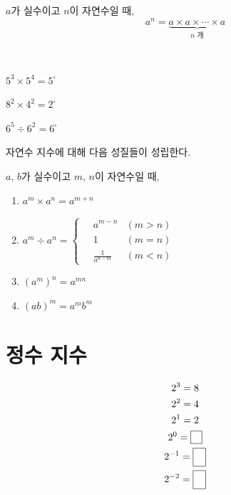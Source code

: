 \documentclass{oblivoir}
\begin{document}
\begin{mdframed}
%
\label{natural2}
\(a\)가 실수이고 \(n\)이 자연수일 때,
\[a^n=\underbrace{a\times a\times\cdots\times a}_\text{$n$ 개}\]
\end{mdframed}

%
\label{natural3}
\\[-10pt]
\begin{enumerate*}[itemjoin=\hspace{0.15\textwidth}]
\item
\(5^3\times5^4=5^\square\)
\item
\(8^2\times4^2=2^\square\)
\item
\(6^5\div6^2=6^\square\)
\end{enumerate*}

\bigskip\noindent
자연수 지수에 대해 다음 성질들이 성립한다.
%
\begin{mdframed}
\label{natural4}
\(a\), \(b\)가 실수이고 \(m\), \(n\)이 자연수일 때,
\begin{enumerate}
\item
\(a^m\times a^n=a^{m+n}\)
\item
\(\displaystyle a^m\div a^n=
\begin{cases}
\quad	a^{m-n}		&(m>n)\\
\quad	1			&(m=n)\\
\quad	\frac1{a^{n-m}}&(m<n)
\end{cases}
\)
\item
\((a^m)^n=a^{mn}\)
\item
\((ab)^m=a^mb^m\)
\end{enumerate}
\end{mdframed}

\section{정수 지수}
%
\label{integer1}
\vspace{-20pt}
\begin{gather*}
2^3		=8\\
2^2		=4\\
2^1		=2\\
2^0		=\pb{0}\\
2^{-1}	=\pb{\frac12}\\
2^{-2}	=\pb{\frac14}
\end{gather*}
\end{document}
